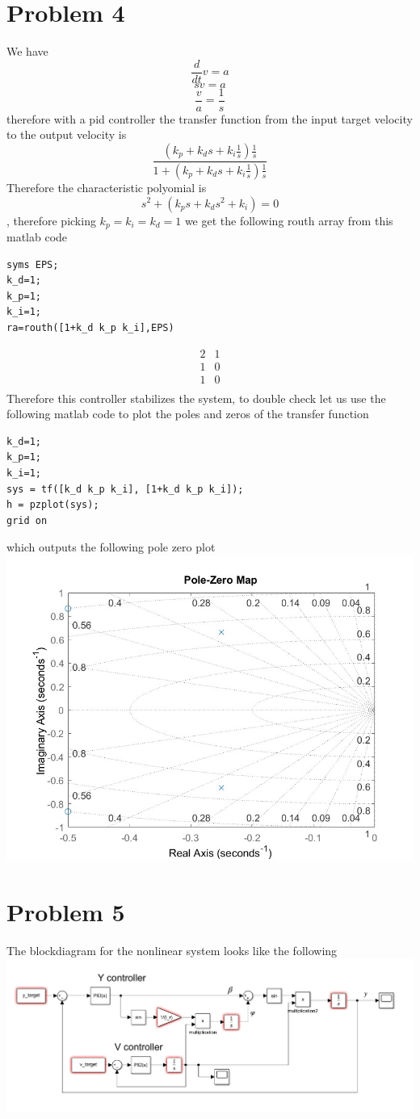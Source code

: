 \documentclass[12pt]{article}
\begin{document}
\section*{Problem 4}
We have
$$\frac{d}{dt}v=a$$
$$sv=a$$
$$\frac{v}{a}=\frac{1}{s}$$
therefore with a pid controller the transfer function from the input target velocity to the output velocity is 
$$\frac{(k_p+k_ds+k_i\frac{1}{s})\frac{1}{s}}{1+(k_p+k_ds+k_i\frac{1}{s})\frac{1}{s}}$$
Therefore the characteristic polyomial is 
$$s^2+(k_ps+k_ds^2+k_i)=0$$, therefore picking $k_p=k_i=k_d=1$ we get the following routh array from this matlab code
\begin{verbatim}
syms EPS;
k_d=1;
k_p=1;
k_i=1;
ra=routh([1+k_d k_p k_i],EPS)
\end{verbatim}
$$\begin{matrix}
    2 & 1\\
    1 & 0\\
    1 & 0\\
\end{matrix}$$
Therefore this controller stabilizes the system, to double check let us use the following matlab code to plot the poles and zeros of the transfer function
\begin{verbatim}
k_d=1;
k_p=1;
k_i=1;
sys = tf([k_d k_p k_i], [1+k_d k_p k_i]);
h = pzplot(sys);
grid on
\end{verbatim}
which outputs the following pole zero plot\\
\includegraphics[scale=0.4]{Problem4Fig1.jpg}\\
\section*{Problem 5}
The blockdiagram for the nonlinear system looks like the following\\
\includegraphics[scale=0.4]{Problem5BlockDiagram.PNG}\\
\end{document}
